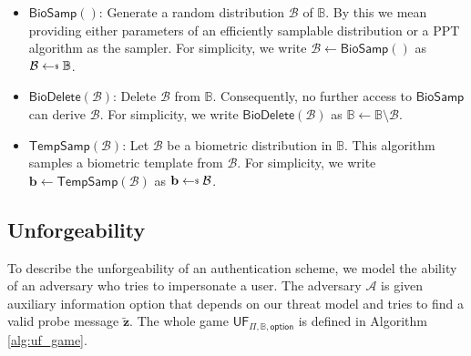 \begin{itemize}

	\item $\textsf{BioSamp}()$: Generate a random distribution $\mathcal{B}$ of $\mathbb{B}$. By this we mean providing either parameters of an efficiently samplable distribution or a PPT algorithm as the sampler. For simplicity, we write $\mathcal{B} \gets \textsf{BioSamp}()$ as $\mathcal{B} \getsdollar \mathbb{B}$.
	
	\item $\textsf{BioDelete}(\mathcal{B})$: Delete $\mathcal{B}$ from $\mathbb{B}$. Consequently, no further access to $\textsf{BioSamp}$ can derive $\mathcal{B}$. For simplicity, we write $\textsf{BioDelete}(\mathcal{B})$ as $\mathbb{B} \gets \mathbb{B} \setminus \mathcal{B}$.

	\item $\textsf{TempSamp}(\mathcal{B})$: Let $\mathcal{B}$ be a biometric distribution in $\mathbb{B}$. This algorithm samples a biometric template from $\mathcal{B}$. For simplicity, we write $\mathbf{b} \gets \textsf{TempSamp}(\mathcal{B})$ as $\mathbf{b} \getsdollar \mathcal{B}$.

\end{itemize}



\subsection{Unforgeability}
\label{sec:uf_game}

To describe the unforgeability of an authentication scheme, we model the ability of an adversary who tries to impersonate a user. The adversary $\mathcal{A}$ is given auxiliary information \textsf{option} that depends on our threat model and tries to find a valid probe message $\mathbf{\tilde{z}}$. The whole game $\textsf{UF}_{\Pi, \mathbb{B}, \textsf{option}}$ is defined in Algorithm \ref{alg:uf_game}.

